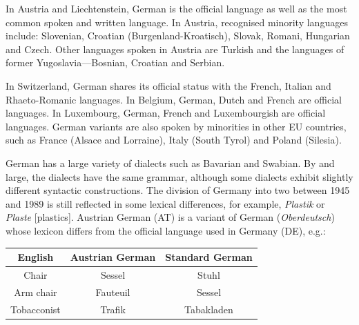 \documentclass[]{../../metanetpaper}
\begin{document}
\begin{Parallel}[c]{80mm}{80mm}
{    In Austria and Liechtenstein, German is the official language as well as the most common spoken and written language. In Austria, recognised minority languages include: Slovenian, Croatian (Burgenland-Kroatisch), Slovak, Romani, Hungarian and Czech. Other languages spoken in Austria are Turkish and the languages of former Yugoslavia—Bosnian, Croatian and Serbian.

    In Switzerland, German shares its official status with the French, Italian and Rhaeto-Romanic languages. In Belgium, German, Dutch and French are official languages. In Luxembourg, German, French and Luxembourgish are official languages. German variants are also spoken by minorities in other EU countries, such as France (Alsace and Lorraine), Italy (South Tyrol) and Poland (Silesia).

    German has a large variety of dialects such as Bavarian and Swabian. By and large, the dialects have the same grammar, although some dialects exhibit slightly different syntactic constructions. The division of Germany into two between 1945 and 1989 is still reflected in some lexical differences, for example, \textit{Plastik} or \textit{Plaste} {[}plastics{]}.
    Austrian German (AT) is a variant of German (\textit{Oberdeutsch}) whose lexicon differs from the official language used in Germany (DE), e.g.:
  }
  \ParallelPar

  \begin{tabular*}{\textwidth}{c|c|c}
    \hline
    \textbf{English} & \textbf{Austrian German} & \textbf{Standard German}\\
    \hline
    Chair & Sessel & Stuhl\\
    \hline
    Arm chair & Fauteuil & Sessel\\
    \hline
    Tobacconist & Trafik & Tabakladen\\
    \hline
  \end{tabular*}



\end{Parallel}
\end{document}
